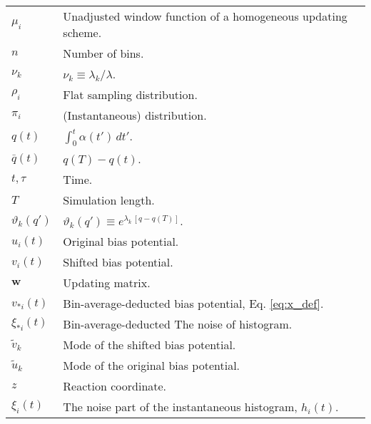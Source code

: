 \documentclass[reprint, superscriptaddress, floatfix]{revtex4-1}
\begin{document}
{\begin{table*}
\begin{tabular}{l | p{12cm} }
    $\mu_i$         &   Unadjusted window function of a homogeneous updating scheme. \\
    $n$             &   Number of bins. \\
    $\nu_k$         &   $\nu_k \equiv \lambda_k / \lambda$. \\
    $\rho_i$        &   Flat sampling distribution. \\
    $\pi_i$         &   (Instantaneous) distribution. \\
    $q(t)$          &   $\int_0^t \alpha(t') \, dt'$.  \\
    $\bar q(t)$     &   $q(T) - q(t)$.  \\
    $t, \tau$       &   Time. \\
    $T$             &   Simulation length. \\
    $\vartheta_k(q')$       &   $\vartheta_k(q') \equiv e^{\lambda_k \, [q - q(T)]}$. \\
    $u_i(t)$        &   Original bias potential. \\
    $v_i(t)$        &   Shifted bias potential. \\
    $\mathbf w$     &   Updating matrix. \\
    $v_{*i}(t)$     &   Bin-average-deducted bias potential, Eq. \eqref{eq:x_def}. \\
    $\xi_{*i}(t)$   &   Bin-average-deducted The noise of histogram. \\
    ${\tilde v}_k$  &   Mode of the shifted bias potential. \\
    ${\tilde u}_k$  &   Mode of the original bias potential. \\
    $z$             &   Reaction coordinate. \\
    $\xi_i(t)$    &   The noise part of the instantaneous histogram, $h_i(t)$.
  \end{tabular}
  \end{table*}
}


\end{document}
